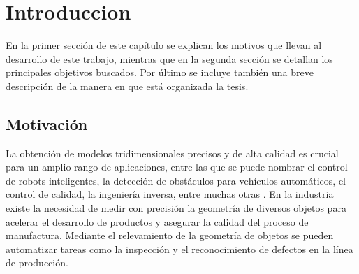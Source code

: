 \chapter{Introduccion}\label{ch:introduction}

En la primer sección de este capítulo se explican los motivos que llevan al desarrollo de este trabajo, mientras que en la segunda sección se detallan los principales objetivos buscados. 
Por último se incluye también una breve descripción de la manera en que está organizada la tesis.

\section{Motivación}
La obtención de modelos tridimensionales precisos y de alta calidad es crucial para un amplio rango de aplicaciones, entre las que se puede nombrar el control de robots inteligentes, la detección de obstáculos para vehículos automáticos, el control de calidad, la ingeniería inversa, entre muchas otras \cite{chen2000overview}. En la industria existe la necesidad de medir con precisión la geometría de diversos objetos para acelerar el desarrollo de productos y asegurar la calidad del proceso de manufactura. Mediante el relevamiento de la geometría de objetos se pueden automatizar tareas como la inspección y el reconocimiento de defectos en la línea de producción.

